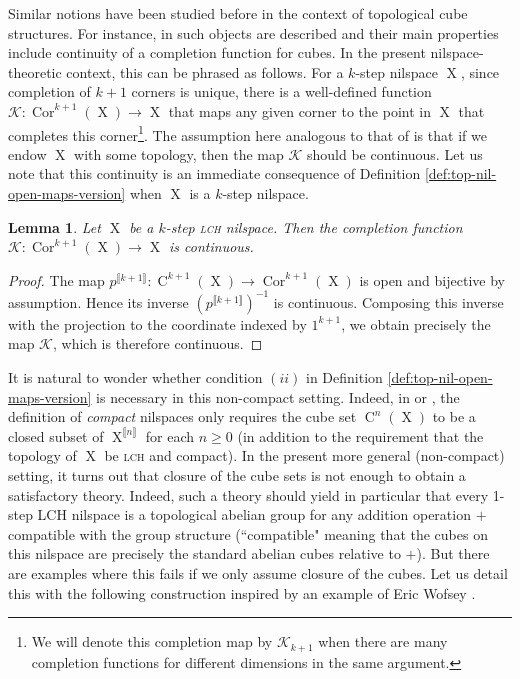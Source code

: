 \documentclass[a4paper,12pt,reqno]{amsart}
\newtheorem{lemma}[theorem]{Lemma}
\theoremstyle{definition}
\def\to{\rightarrow}
\newcommand*{\db}[1]{\llbracket #1\rrbracket}
\newcommand{\mc}{\mathcal}
\DeclareMathOperator{\ns}{X}
\DeclareMathOperator{\cu}{C}
\DeclareMathOperator{\cor}{Cor}
\begin{document}
\noindent Similar notions have been studied before in the context of topological cube structures. For instance, in \cite[\S 2.2, Proposition 7 (iii)]{HKbook} such objects are described and their main properties include continuity of a completion function for cubes. In the present nilspace-theoretic context, this can be phrased as follows. For a $k$-step nilspace $\ns$, since completion of $k+1$ corners is unique, there is a well-defined function $\mc{K}:\cor^{k+1}(\ns)\to \ns$ that maps any given corner to the point in $\ns$ that completes this corner\footnote{We will denote this completion map by $\mc{K}_{k+1}$ when there are many completion functions for different dimensions in the same argument.}. The assumption here analogous to that of \cite{HKbook} is that if we endow $\ns$ with some topology, then the map $\mc{K}$ should be continuous. Let us note that this continuity is an immediate consequence of Definition \ref{def:top-nil-open-maps-version} when $\ns$ is a $k$-step nilspace.
\begin{lemma}\label{lem:cont-if-open}
Let $\ns$ be a $k$-step \textsc{lch} nilspace. Then the completion function $\mc{K}:\cor^{k+1}(\ns)\to\ns$ is continuous.
\end{lemma}
\begin{proof}
The map $p^{\db{k+1}}:\cu^{k+1}(\ns)\to \cor^{k+1}(\ns)$ is open and bijective by assumption. Hence its inverse $(p^{\db{k+1}})^{-1}$ is continuous. Composing this inverse with the projection to the coordinate indexed by $1^{k+1}$, we obtain precisely the map $\mc{K}$, which is therefore continuous.
\end{proof}
It is natural to wonder whether condition $(ii)$ in Definition \ref{def:top-nil-open-maps-version} is necessary in this non-compact setting. Indeed, in \cite{CamSzeg} or \cite[Definition 1.0.2]{Cand:Notes2}, the definition of \emph{compact} nilspaces only requires the cube set $\cu^n(\ns)$ to be a closed subset of $\ns^{\db{n}}$ for each $n\geq 0$ (in addition to the requirement that the topology of $\ns$ be \textsc{lch} and compact). In the present more general (non-compact) setting, it turns out that closure of the cube sets is not enough to obtain a satisfactory theory. Indeed, such a theory should yield in particular that every 1-step LCH nilspace is a topological abelian group for any addition operation $+$ compatible with the group structure (``compatible" meaning that the cubes on this nilspace are precisely the standard abelian cubes relative to $+$). But there are examples where this fails if we only assume closure of the cubes. Let us detail this with the following construction inspired by an example of Eric Wofsey \cite{WofStackEx}.
\end{document}
